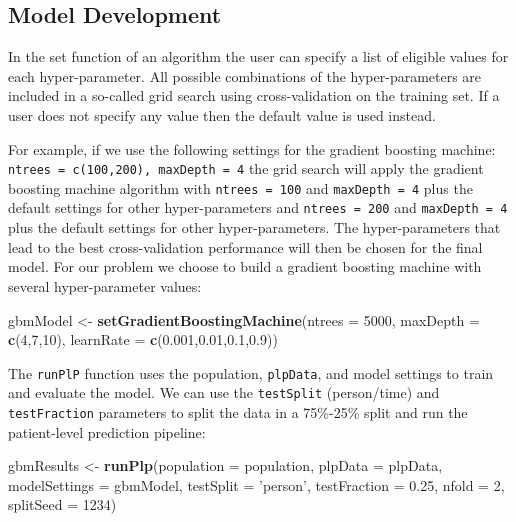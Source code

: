 \documentclass[11pt]{book}
\newenvironment{Shaded}{\begin{snugshade}}{\end{snugshade}}
\newcommand{\KeywordTok}[1]{\textcolor[rgb]{0.13,0.29,0.53}{\textbf{#1}}}
\newcommand{\DataTypeTok}[1]{\textcolor[rgb]{0.13,0.29,0.53}{#1}}
\newcommand{\DecValTok}[1]{\textcolor[rgb]{0.00,0.00,0.81}{#1}}
\newcommand{\FloatTok}[1]{\textcolor[rgb]{0.00,0.00,0.81}{#1}}
\newcommand{\StringTok}[1]{\textcolor[rgb]{0.31,0.60,0.02}{#1}}
\newcommand{\NormalTok}[1]{#1}
\theoremstyle{definition}
\theoremstyle{definition}
\theoremstyle{definition}
\theoremstyle{remark}
\begin{document}
\subsection{Model Development}\label{model-development}

In the set function of an algorithm the user can specify a list of
eligible values for each hyper-parameter. All possible combinations of
the hyper-parameters are included in a so-called grid search using
cross-validation on the training set. If a user does not specify any
value then the default value is used instead.

For example, if we use the following settings for the gradient boosting
machine: \texttt{ntrees\ =\ c(100,200),\ maxDepth\ =\ 4} the grid search
will apply the gradient boosting machine algorithm with
\texttt{ntrees\ =\ 100} and \texttt{maxDepth\ =\ 4} plus the default
settings for other hyper-parameters and \texttt{ntrees\ =\ 200} and
\texttt{maxDepth\ =\ 4} plus the default settings for other
hyper-parameters. The hyper-parameters that lead to the best
cross-validation performance will then be chosen for the final model.
For our problem we choose to build a gradient boosting machine with
several hyper-parameter values:

\begin{Shaded}
\begin{Highlighting}[]
\NormalTok{gbmModel <-}\StringTok{ }\KeywordTok{setGradientBoostingMachine}\NormalTok{(}\DataTypeTok{ntrees =} \DecValTok{5000}\NormalTok{, }
                                       \DataTypeTok{maxDepth =} \KeywordTok{c}\NormalTok{(}\DecValTok{4}\NormalTok{,}\DecValTok{7}\NormalTok{,}\DecValTok{10}\NormalTok{), }
                                       \DataTypeTok{learnRate =} \KeywordTok{c}\NormalTok{(}\FloatTok{0.001}\NormalTok{,}\FloatTok{0.01}\NormalTok{,}\FloatTok{0.1}\NormalTok{,}\FloatTok{0.9}\NormalTok{))}
\end{Highlighting}
\end{Shaded}

The \texttt{runPlP} function uses the population, \texttt{plpData}, and
model settings to train and evaluate the model. We can use the
\texttt{testSplit} (person/time) and \texttt{testFraction} parameters to
split the data in a 75\%-25\% split and run the patient-level prediction
pipeline:

\begin{Shaded}
\begin{Highlighting}[]
\NormalTok{gbmResults <-}\StringTok{ }\KeywordTok{runPlp}\NormalTok{(}\DataTypeTok{population =}\NormalTok{ population, }
                     \DataTypeTok{plpData =}\NormalTok{ plpData, }
                     \DataTypeTok{modelSettings =}\NormalTok{ gbmModel, }
                     \DataTypeTok{testSplit =} \StringTok{'person'}\NormalTok{,}
                     \DataTypeTok{testFraction =} \FloatTok{0.25}\NormalTok{, }
                     \DataTypeTok{nfold =} \DecValTok{2}\NormalTok{, }
                     \DataTypeTok{splitSeed =} \DecValTok{1234}\NormalTok{)}
\end{Highlighting}
\end{Shaded}
\end{document}
